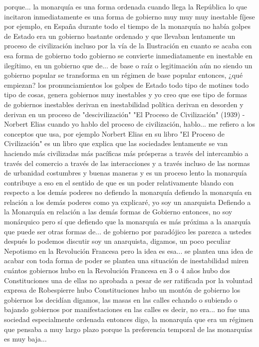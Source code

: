 porque... la monarquía es una forma ordenada cuando llega la República lo que incitaron inmediatamente
es una forma de gobierno muy muy muy inestable fíjese por ejemplo, en España
durante todo el tiempo de la monarquía no había golpes de Estado era un gobierno bastante ordenado y que llevaban lentamente un proceso de civilización
incluso por la vía de la Ilustración en cuanto se acaba con esa forma de gobierno todo gobierno se convierte inmediatamente en inestable
en ilegítimo, en un gobierno que de... de base o raíz o legitimación aún no siendo un gobierno popular
se transforma en un régimen de base popular entonces, ¿qué empiezan? los pronunciamientos los golpes de Estado
todo tipo de motines todo tipo de cosas, genera gobiernos muy inestables y yo creo que ese tipo de formas de gobiernos inestables
derivan en inestabilidad política derivan en desorden y derivan en un proceso de "descivilización"
"El Proceso de Civilización" (1939) - Norbert Elias
cuando yo hablo del proceso de civilización, hablo... me refiero a los conceptos que usa, por ejemplo Norbert Elias
en su libro "El Proceso de Civilización" es un libro que explica que las sociedades lentamente
se van haciendo más civilizadas más pacíficas más prósperas a través del intercambio
a través del comercio a través de las interacciones y a través incluso de las normas de urbanidad costumbres y buenas maneras y es un proceso lento
la monarquía contribuye a eso en el sentido de que es un poder relativamente blando
con respecto a los demás poderes no defiendo la monarquía defiendo la monarquía en relación a los demás poderes como ya explicaré, yo soy un anarquista
Defiendo a la Monarquía en relación a las demás formas de Gobierno
entonces, no soy monárquico pero sí que defiendo que la monarquía es más próxima a la anarquía que puede ser otras formas de...
de gobierno por paradójico les parezca a ustedes después lo podemos discutir soy un anarquista, digamos, un poco peculiar
Nepotismo en la Revolución Francesa
pero la idea es esa... se plantea una idea de acabar con toda forma de poder se plantea una situación de inestabilidad
miren cuántos gobiernos hubo en la Revolución Francesa en 3 o 4 años hubo dos Constituciones una de ellas no aprobada
a pesar de ser ratificada por la voluntad expresa de Robespierre hubo Constituciones hubo un montón de gobierno
los gobiernos los decidían digamos, las masas en las calles echando o subiendo o bajando gobiernos
por manifestaciones en las calles es decir, no era... no fue una sociedad especialmente ordenada entonces digo, la monarquía
que era un régimen que pensaba a muy largo plazo porque la preferencia temporal de las monarquías es muy baja...
